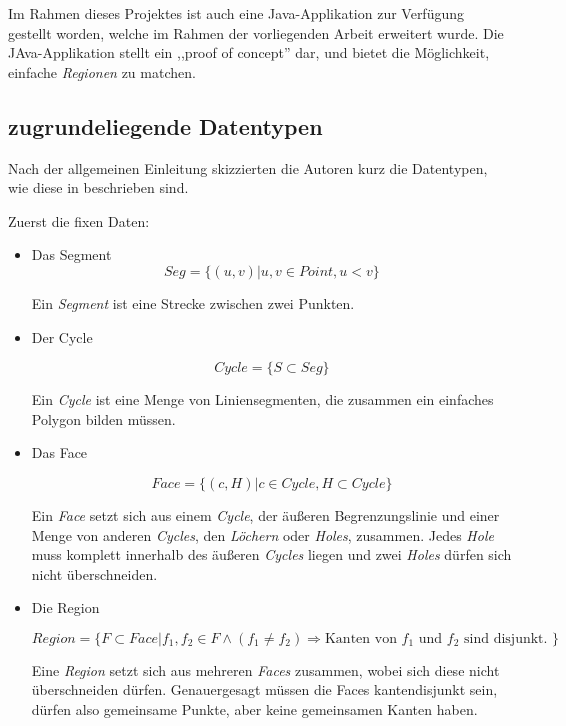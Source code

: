 Im Rahmen dieses Projektes ist auch eine Java-Applikation zur Verfügung gestellt worden, welche im Rahmen der vorliegenden Arbeit erweitert wurde. Die JAva-Applikation stellt ein ,,proof of concept'' dar, und bietet die Möglichkeit, einfache \textit{Regionen} zu matchen.

\subsection{zugrundeliegende Datentypen}\label{DatenMoving}
Nach der allgemeinen Einleitung skizzierten die Autoren kurz die Datentypen, wie diese in \cite{FGNS} beschrieben sind.

Zuerst die fixen Daten:

\begin{itemize}

\item Das Segment
$$Seg=\{(u,v)|u,v\in Point, u<v\}$$

Ein \textit{Segment} ist eine Strecke zwischen zwei Punkten. 

\item Der Cycle 

$$Cycle=\{S\subset Seg\}$$

Ein \textit{Cycle} ist eine Menge von Liniensegmenten, die zusammen ein einfaches Polygon bilden müssen.

\item Das Face

$$Face=\{(c,H)|c\in Cycle, H \subset Cycle\}$$

Ein \textit{Face} setzt sich aus einem \textit{Cycle}, der äußeren Begrenzungslinie und einer Menge von anderen \textit{Cycles}, den \textit{Löchern} oder \textit{Holes}, zusammen. Jedes \textit{Hole} muss komplett innerhalb des äußeren \textit{Cycles} liegen und zwei \textit{Holes} dürfen sich nicht überschneiden. 

\item Die Region

$$Region=\{F\subset Face|f_1,f_2\in F \wedge (f_1\neq f_2) \Rightarrow \text{Kanten von }f_1\text{ und } f_2 \text{ sind disjunkt. } \}$$

Eine \textit{Region} setzt sich aus mehreren \textit{Faces} zusammen, wobei sich diese nicht überschneiden dürfen. Genauergesagt müssen die Faces kantendisjunkt sein, dürfen also gemeinsame Punkte, aber keine gemeinsamen Kanten haben.
\end{itemize}

